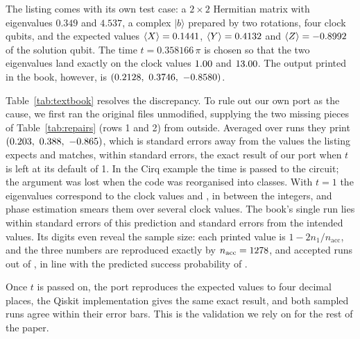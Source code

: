 \documentclass[manuscript,screen,review,nonacm]{acmart}
\newcommand{\ket}[1]{\lvert #1\rangle}
\begin{document}
The listing comes with its own test case: a $2\times 2$ Hermitian matrix with
eigenvalues $0.349$ and $4.537$, a complex $\ket{b}$ prepared by two
rotations, four clock qubits, and the expected values
$\langle X\rangle=0.1441$, $\langle Y\rangle=0.4132$ and
$\langle Z\rangle=-0.8992$ of the solution qubit. The time
$t=0.358166\,\pi$ is chosen so that the two eigenvalues land exactly on the
clock values $1.00$ and $13.00$. The output printed in
the book, however, is $(\TbPrintedX,\ \TbPrintedY,\ \TbPrintedZ)$.

\begin{table}[t]
  \caption{The textbook example: Pauli expectation values of the solution
    qubit. ``Exact'' rows are computed from the state vector; sampled rows
    show one standard error.}
  \label{tab:textbook}
  \small
  
\end{table}

Table~\ref{tab:textbook} resolves the discrepancy. To rule out our own port as
the cause, we first ran the original files unmodified, supplying the two
missing pieces of Table~\ref{tab:repairs} (rows 1 and 2) from outside. Averaged
over \TbReplayRuns{} runs they print $(0.203,\ 0.388,\ -0.865)$,
which is \TbReplaySigmaExpected{} standard errors away from the values the
listing expects and matches, within \TbReplaySigmaAsPrinted{} standard errors,
the exact result of our port when $t$ is left at its default of 1. In the Cirq
example the time is passed to the circuit; the argument was lost when the code
was reorganised into classes. With $t=1$ the eigenvalues correspond to the clock values
\TbClockAsPrintedLow{} and \TbClockAsPrintedHigh, in between the integers, and
phase estimation smears them over several clock values. The book's single run
lies within \TbSigmaAsPrinted{} standard errors of this prediction and
\TbSigmaExpected{} standard errors from the intended values. Its digits even
reveal the sample size: each printed value is $1-2n_1/n_{\mathrm{acc}}$, and
the three numbers are reproduced exactly by $n_{\mathrm{acc}}=1278$,
\TbAcceptedY{} and \TbAcceptedZ{} accepted runs out of \TbShots, in line with
the predicted success probability of \TbSuccessAsPrinted.

Once $t$ is passed on, the port reproduces the expected values to four decimal
places, the Qiskit implementation gives the same exact result, and both
sampled runs agree within their error bars. This is the validation we rely on
for the rest of the paper.
\end{document}
